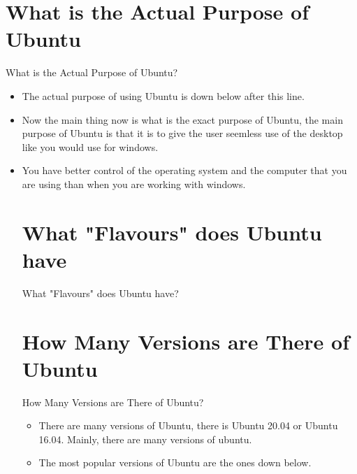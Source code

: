 \documentclass[aspectratio=43]{beamer}
\begin{document}
	
	\section{What is the Actual Purpose of Ubuntu}
\begin{frame}{What is the Actual Purpose of Ubuntu?}
\begin{itemize}
\item The actual purpose of using Ubuntu is down below after this line.
\item Now the main thing now is what is the exact purpose of Ubuntu, the main purpose of Ubuntu is that it is to give the user seemless use of the desktop like you would use for windows.
\item You have better control of the operating system and the computer that you are using than when you are working with windows.


\section{What "Flavours" does Ubuntu have }
\begin{frame}{What "Flavours" does Ubuntu have?}
\begin{itemize}
\end{itemize}
\end{frame}




\section{How Many Versions are There of Ubuntu}
\begin{frame}{How Many Versions are There of Ubuntu?}
\begin{itemize}
\item There are many versions of Ubuntu, there is Ubuntu 20.04 or Ubuntu 16.04. Mainly, there are many versions of ubuntu.
\item The most popular versions of Ubuntu are the ones down below.



\end{itemize}
\end{frame}
\end{itemize}
\end{frame}
\end{document}
